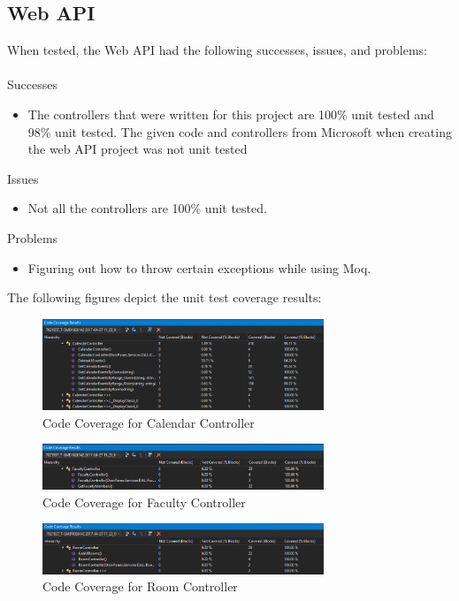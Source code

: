 \subsection{Web API}
When tested, the Web API had the following successes, issues, and problems:\\\\
Successes
\begin{itemize}
\item The controllers that were written for this project are 100\% unit tested and 98\% unit tested. The given code and controllers from Microsoft when creating the web API project was not unit tested
\end{itemize}
Issues
\begin{itemize}
\item Not all the controllers are 100\% unit tested.
\end{itemize}
Problems
\begin{itemize}
\item Figuring out how to throw certain exceptions while using Moq.
\end{itemize}
The following figures depict the unit test coverage results:

\begin{figure}[h!]
\centering
\includegraphics[width=0.75\textwidth]{./DetailCalendarCoverage.PNG}
\caption{Code Coverage for Calendar Controller}
\label{CalendarControllerCoverage}
\end{figure}

\begin{figure}[h!]
\centering
\includegraphics[width=0.75\textwidth]{./DetailFacultyCoverage.PNG}
\caption{Code Coverage for Faculty Controller}
\label{FacultyControllerCoverage}
\end{figure}

\begin{figure}[h!]
\centering
\includegraphics[width=0.75\textwidth]{./DetailRoomCoverage.PNG}
\caption{Code Coverage for Room Controller}
\label{RoomControllerCoverage}
\end{figure}

